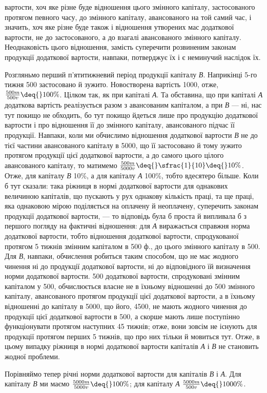 \parcont{}  %
вартости, хоч яке різне буде відношення цього змінного капіталу, застосованого
протягом певного часу, до змінного капіталу, авансованого на
той самий час, і значить, хоч яке різне буде також і відношення утворених
мас додаткової вартости, не до застосованого, а до взагалі авансованого
змінного капіталу. Неоднаковість цього відношення, замість суперечити
розвиненим законам продукції додаткової вартости, навпаки,
потверджує їх і є неминучий наслідок їх.

Розгляньмо перший п’ятитижневий період продукції капіталу \emph{В}. Наприкінці
5-го тижня 500 застосовано й зужито. Новостворена
вартість \deq{} 1000, отже, $\frac{500m}{500v} \deq{} 100\%$. Цілком так, як при капіталі \emph{А}.
Та обставина, що при капіталі \emph{А} додаткова вартість реалізується разом з
авансованим капіталом, а при \emph{В} — ні, нас тут покищо не обходить, бо
тут покищо йдеться лише про продукцію додаткової вартости і про
відношення її до змінного капіталу, авансованого підчас її продукції.
Навпаки, коли ми обчислимо відношення додаткової вартости \emph{В} не
до тієї частини авансованого капіталу в 5000, що її застосовано й
тому зужито протягом продукції цієї додаткової вартости, а до самого
цього цілого авансованого капіталу, то матимемо $\frac{500m}{5000v} \deq{} \sfrac{1}{10} \deq{} 10\%$.
Отже, для капіталу \emph{В} 10\%, а для капіталу \emph{А} 100\%, тобто вдесятеро
більше. Коли б тут сказали: така ріжниця в нормі додаткової вартости
для однакових величиною капіталів, що пускають у рух однакову кількість
праці, та ще праці, яка однаковою мірою поділяється на оплачену й
неоплачену, суперечить законам продукції додаткової вартости, — то
відповідь була б проста й випливала б з першого погляду на фактичні
відношення: для \emph{А} виражається справжня норма додаткової вартости,
тобто відношення додаткової вартости, спродукованої протягом 5 тижнів
змінним капіталом в 500 ф., до цього змінного капіталу в 500.
Для \emph{В}, навпаки, обчислення робиться таким способом, що не має жодного
чинення ні до продукції додаткової вартости, ні до відповідного їй
визначення норми додаткової вартости. 500 додаткової вартости,
спродуковані змінним капіталом у 500, обчислюється
власне не в їхньому відношенні до 500 змінного капіталу, авансованого
протягом продукції цієї додаткової вартости, а в їхньому відношенні
до капіталу в 5000, що  його, 4500, не мають
жодного чинення до продукції цієї додаткової вартости в 500, а
скорше мають лише поступінно функціонувати протягом наступних 45 тижнів;
отже, вони зовсім не існують для продукції протягом перших 5 тижнів,
що про них тільки й мовиться тут. Отже, в цьому випадку ріжниця
в нормі додаткової вартости капіталів \emph{А} і \emph{В} не становить жодної
проблеми.

Порівняймо тепер річні норми додаткової вартости для капіталів \emph{В} і \emph{А}.
Для капіталу \emph{В} ми маємо $\frac{5000m}{5000v} \deq{} 100\%$;
для капіталу \emph{А} $\frac{5000m}{500v} \deq{} 1000\%$.
\parbreak{}  %
